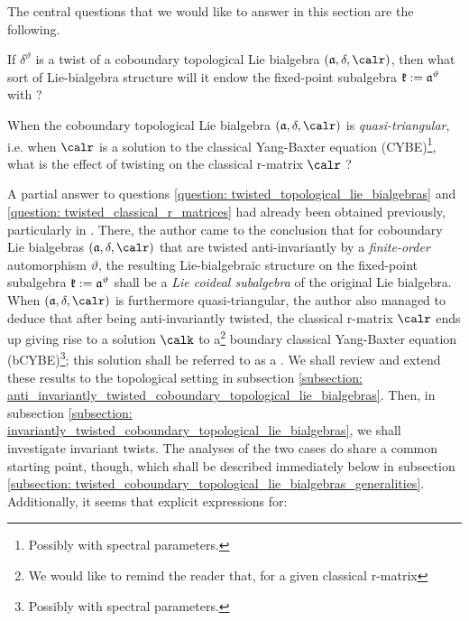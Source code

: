         The central questions that we would like to answer in this section are the following.
        \begin{question} \label{question: twisted_topological_lie_bialgebras}
            If $\delta^{\vartheta}$ is a twist of a coboundary topological Lie bialgebra $(\a, \delta, \calr)$, then what sort of Lie-bialgebra structure will it endow the fixed-point subalgebra $\mathfrak{k} := \mathfrak{a}^{\vartheta}$ with ?
        \end{question}
        \begin{question} \label{question: twisted_classical_r_matrices}
            When the coboundary topological Lie bialgebra $(\a, \delta, \calr)$ is \textit{quasi-triangular}, i.e. when $\calr$ is a solution to the classical Yang-Baxter equation (CYBE)\footnote{Possibly with spectral parameters.}, what is the effect of twisting on the classical r-matrix $\calr$ ?
        \end{question}
        A partial answer to questions \ref{question: twisted_topological_lie_bialgebras} and \ref{question: twisted_classical_r_matrices} had already been obtained previously, particularly in \cite{schrader_integrable_systems_from_classical_reflection_equations}. There, the author came to the conclusion that for  coboundary Lie bialgebras $(\a, \delta, \calr)$ that are twisted anti-invariantly by a \textit{finite-order} automorphism $\vartheta$, the resulting Lie-bialgebraic structure on the fixed-point subalgebra $\mathfrak{k} := \mathfrak{a}^{\vartheta}$ shall be a \textit{Lie coideal subalgebra} of the original Lie bialgebra. When $(\a, \delta, \calr)$ is furthermore quasi-triangular, the author also managed to deduce that after being anti-invariantly twisted, the classical r-matrix $\calr$ ends up giving rise to a solution $\calk$ to a\footnote{We would like to remind the reader that, for a given classical r-matrix} boundary classical Yang-Baxter equation (bCYBE)\footnote{Possibly with spectral parameters.}; this solution shall be referred to as a . We shall review and extend these results to the topological setting in subsection \ref{subsection: anti_invariantly_twisted_coboundary_topological_lie_bialgebras}. Then, in subsection \ref{subsection: invariantly_twisted_coboundary_topological_lie_bialgebras}, we shall investigate invariant twists. The analyses of the two cases do share a common starting point, though, which shall be described immediately below in subsection \ref{subsection: twisted_coboundary_topological_lie_bialgebras_generalities}. Additionally, it seems that explicit expressions for:
